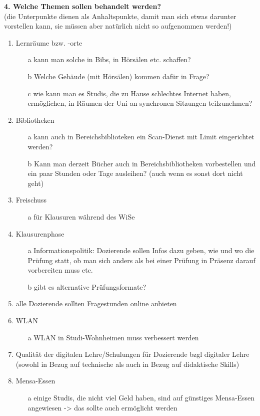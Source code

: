 \textbf{4. Welche Themen sollen behandelt werden?}\\
(die Unterpunkte dienen als Anhaltspunkte, damit man sich etwas darunter vorstellen kann, sie müssen aber natürlich nicht so aufgenommen werden!)
\begin{enumerate}
    \item Lernräume bzw. -orte
        \begin{enumerate}
            \item[a]kann man solche in Bibs, in Hörsälen etc. schaffen?
            \item[b]Welche Gebäude (mit Hörsälen) kommen dafür in Frage?
            \item[c]wie kann man es Studis, die zu Hause schlechtes Internet haben, ermöglichen, in Räumen der Uni an synchronen Sitzungen teilzunehmen? 
        \end{enumerate}
    \item Bibliotheken
        \begin{enumerate}
            \item[a]kann auch in Bereichsbiblioteken ein Scan-Dienst mit Limit eingerichtet werden?
            \item[b]Kann man derzeit Bücher auch in Bereichsbibliotheken vorbestellen und ein paar Stunden oder Tage ausleihen? (auch wenn es sonst dort nicht geht)
        \end{enumerate}
    \item Freischuss
        \begin{enumerate}
            \item[a] für Klausuren während des WiSe 
        \end{enumerate}
    \item Klausurenphase
        \begin{enumerate}
            \item[a]Informationspolitik: Dozierende sollen Infos dazu geben, wie und wo die Prüfung statt, ob man sich anders als bei einer Prüfung in Präsenz darauf vorbereiten muss etc.
            \item[b]gibt es alternative Prüfungsformate?
        \end{enumerate}
    \item alle Dozierende sollten Fragestunden online anbieten
    \item WLAN
        \begin{enumerate}
            \item[a] WLAN in Studi-Wohnheimen muss verbessert werden
        \end{enumerate}
    \item Qualität der digitalen Lehre/Schulungen für Dozierende bzgl digitaler Lehre (sowohl in Bezug auf technische als auch in Bezug auf didaktische Skills)
    \item Mensa-Essen
        \begin{enumerate}
            \item[a] einige Studis, die nicht viel Geld haben, sind auf günstiges Mensa-Essen angewiesen -> das sollte auch ermöglicht werden
        \end{enumerate}
\end{enumerate}
